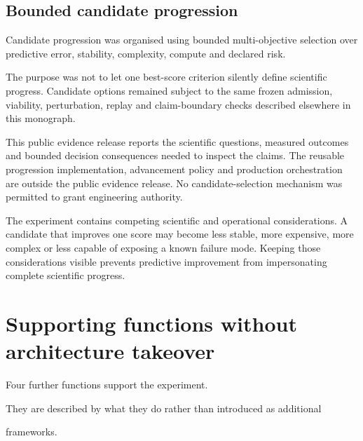 \documentclass[11pt,a4paper,oneside]{report}
\begin{document}
\subsection{Bounded candidate progression}

Candidate progression was organised using bounded multi-objective selection over
predictive error,
stability,
complexity,
compute
and declared risk.

The purpose was not to let one best-score criterion silently define scientific
progress.
Candidate options remained subject to the same frozen admission,
viability,
perturbation,
replay
and claim-boundary checks described elsewhere in this monograph.

This public evidence release reports the scientific questions,
measured outcomes
and bounded decision consequences needed to inspect the claims.
The reusable progression implementation,
advancement policy
and production orchestration are outside the public evidence release.
No candidate-selection mechanism was permitted to grant engineering authority.

\begin{reviewerquestion}

The experiment contains competing scientific and operational considerations.
A candidate that improves one score may become less stable,
more expensive,
more complex
or less capable of exposing a known failure mode.
Keeping those considerations visible prevents predictive improvement from
impersonating complete scientific progress.

\end{reviewerquestion}


\section{Supporting functions without architecture takeover}



Four further functions support the experiment.



They are described by what they do rather than introduced as additional

frameworks.
\end{document}
